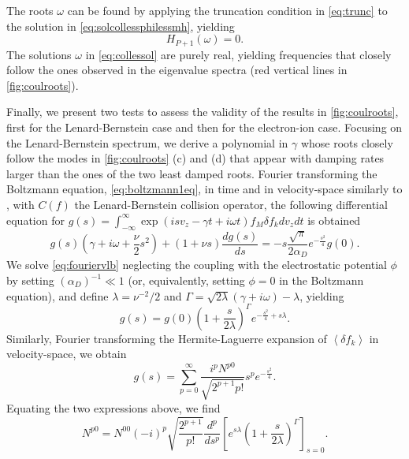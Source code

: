 The roots $\omega$ can be found by applying the truncation condition in \cref{eq:trunc} to the solution in \cref{eq:solcollessphilessmh}, yielding
%
\begin{equation}
    H_{P+1}(\omega) = 0.
\label{eq:collessol}
\end{equation}
%
The solutions $\omega$ in \cref{eq:collessol} are purely real, yielding frequencies that closely follow the ones observed in the eigenvalue spectra (red vertical lines in \cref{fig:coulroots}).

Finally, we present two tests to assess the validity of the results in \cref{fig:coulroots}, first for the Lenard-Bernstein case and then for the electron-ion case.
%
Focusing on the Lenard-Bernstein spectrum, we derive a polynomial in $\gamma$ whose roots closely follow the modes in  \cref{fig:coulroots} (c) and (d) that appear with damping rates larger than the ones of the two least damped roots.
%
Fourier transforming the Boltzmann equation, \cref{eq:boltzmann1eq}, in time and in velocity-space similarly to \citet{Ng2004}, with $C(f)$ the Lenard-Bernstein collision operator, the following differential equation for $g(s)=\int_{-\infty}^{\infty} \exp(i s v_z- \gamma t+i\omega t) f_M \delta f_k dv_z dt$ is obtained
%
\begin{equation}
    g(s)\left(\gamma+i\omega+\frac{\nu}{2}s^2\right)+(1+ \nu s)\frac{d g(s)}{ds}=- s\frac{\sqrt{\pi}}{2 \alpha_D} e^{-\frac{s^2}{4}} g(0).
\label{eq:fouriervlb}
\end{equation}
%
We solve \cref{eq:fouriervlb} neglecting the coupling with the electrostatic potential $\phi$ by setting $(\alpha_D)^{-1} \ll 1$ (or, equivalently, setting $\phi=0$ in the Boltzmann equation), and define $\lambda = \nu^{-2}/2$ and $\Gamma = \sqrt{2 \lambda}(\gamma+i\omega) -\lambda$, yielding
%
\begin{equation}
    g(s) = g(0)\left(1+\frac{s}{2\lambda}\right)^\Gamma e^{-\frac{s^2}{4}+s \lambda}.
\label{eq:fourvelsolLB}
\end{equation}
%
Similarly, Fourier transforming the Hermite-Laguerre expansion of $\left<\delta f_k\right>$ in velocity-space, we obtain
%
\begin{equation}
    g(s) = \sum_{p=0}^\infty \frac{i^p N^{p0}}{\sqrt{2^{p+1}p!}} s^p e^{-\frac{s^2}{4}}.
\label{eq:hermitevelfourier}
\end{equation}
%
Equating the two expressions above, we find
%
\begin{equation}
    N^{p0} = N^{00} (-i)^p  \sqrt{\frac{2^{p+1}}{p!}}\frac{d^p}{d s^p}\left[e^{s \lambda}\left(1+\frac{s}{2\lambda}\right)^\Gamma\right]_{s=0}.
\end{equation}
